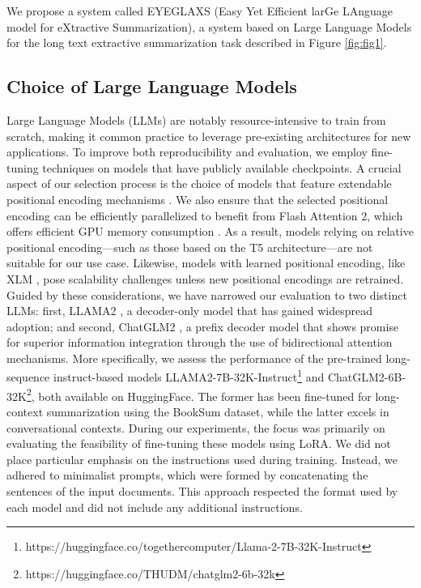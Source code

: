 We propose a system called EYEGLAXS (Easy Yet Efficient larGe LAnguage model for eXtractive Summarization), a system based on Large Language Models for the long text extractive summarization task described in Figure \ref{fig:fig1}. 

\subsection{Choice of Large Language Models}

Large Language Models (LLMs) are notably resource-intensive to train from scratch, making it common practice to leverage pre-existing architectures for new applications. To improve both reproducibility and evaluation, we employ fine-tuning techniques on models that have publicly available checkpoints. A crucial aspect of our selection process is the choice of models that feature extendable positional encoding mechanisms \cite{Rotaryrope, press2021trainalibi}. We also ensure that the selected positional encoding can be efficiently parallelized to benefit from Flash Attention 2, which offers efficient GPU memory consumption \cite{dao2022flashattention, dao2023flashattention2}. As a result, models relying on relative positional encoding—such as those based on the T5 architecture—are not suitable for our use case. Likewise, models with learned positional encoding, like XLM \cite{goyal-etal-2021-largerxlm}, pose scalability challenges unless new positional encodings are retrained.
Guided by these considerations, we have narrowed our evaluation to two distinct LLMs: first, LLAMA2 \cite{touvron2023llama}, a decoder-only model that has gained widespread adoption; and second, ChatGLM2 \cite{zeng2022glm}, a prefix decoder model that shows promise for superior information integration through the use of bidirectional attention mechanisms.
More specifically, we assess the performance of the pre-trained long-sequence instruct-based models LLAMA2-7B-32K-Instruct\footnote{https://huggingface.co/togethercomputer/Llama-2-7B-32K-Instruct} and ChatGLM2-6B-32K\footnote{https://huggingface.co/THUDM/chatglm2-6b-32k}, both available on HuggingFace. The former has been fine-tuned for long-context summarization using the BookSum dataset, while the latter excels in conversational contexts. During our experiments, the focus was primarily on evaluating the feasibility of fine-tuning these models using LoRA. We did not place particular emphasis on the instructions used during training. Instead, we adhered to minimalist prompts, which were formed by concatenating the sentences of the input documents. This approach respected the format used by each model and did not include any additional instructions.

